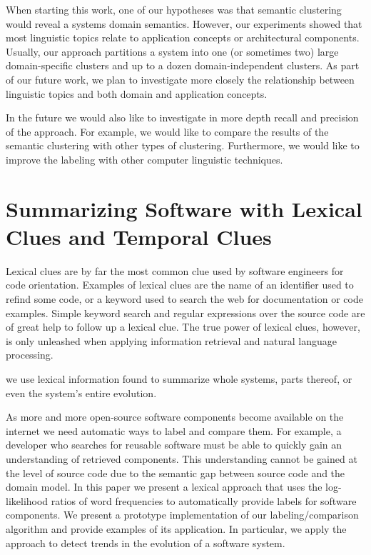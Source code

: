 \documentclass[10pt]{book}
\begin{document}
When starting this work, one of our hypotheses was that semantic clustering would reveal a systems domain semantics. However, our experiments showed that most linguistic topics relate to application concepts or architectural components. Usually, our approach partitions a system into one (or sometimes two) large domain-specific clusters and up to a dozen domain-independent clusters. As part of our future work, we plan to investigate more closely the relationship between linguistic topics and both domain and application concepts.

In the future we would also like to investigate in more depth recall and precision of the approach. For example, we would like to compare the results of the semantic clustering with other types of clustering. Furthermore, we would like to improve the labeling with other computer linguistic techniques.


\chapter{Summarizing Software with Lexical Clues and Temporal Clues}
\label{the chapter on LogLR}

Lexical clues are by far the most common clue used by software engineers for code orientation. Examples of lexical clues are the name of an identifier used to refind some code, or a keyword used to search the web for documentation or code examples. Simple keyword search and regular expressions over the source code are of great help to follow up a lexical clue. The true power of lexical clues, however, is only unleashed when applying information retrieval and natural language processing.

we use lexical information found to summarize whole systems, parts thereof, or even the system's entire evolution.

As more and more open-source software components become available on the internet we need automatic ways to label and compare them. For example, a developer who searches for reusable software must be able to quickly gain an understanding of retrieved components. This understanding cannot be gained at the level of source code due to the semantic gap between source code and the domain model. In this paper we present a lexical approach that uses the log-likelihood ratios of word frequencies to automatically provide labels for software components. We present a prototype implementation of our labeling/comparison algorithm and provide examples of its application. In particular, we apply the approach to detect trends in the evolution of a software system.
\end{document}
